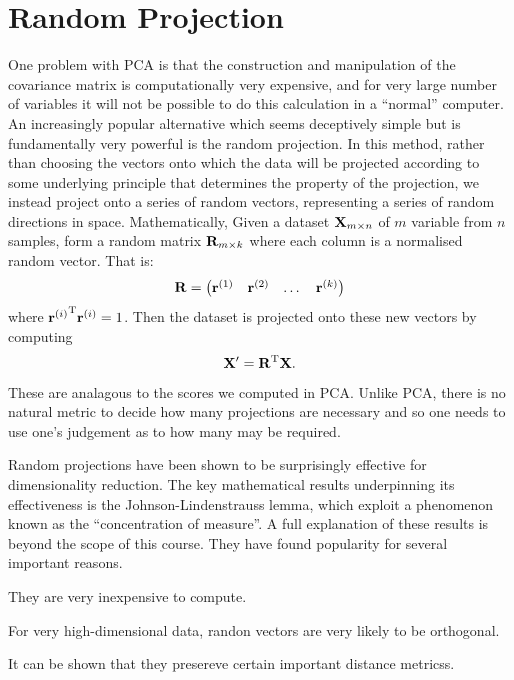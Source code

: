 \documentclass[12pt,a4paper]{tufte-handout}
\begin{document}
\section{Random Projection}
One problem with PCA is that the construction and manipulation of the covariance matrix is computationally very expensive, and for very large number of variables it will not be possible to do this calculation in a ``normal'' computer. An increasingly popular alternative which seems deceptively simple but is fundamentally very powerful is the random projection. In this method, rather than choosing the vectors onto which the data will be projected according to some underlying principle that determines the property of the projection, we instead project onto a series of random vectors, representing a series of random directions in space. Mathematically, Given a dataset $\mathbf{X}_{m\times n}$ of $m$ variable from $n$ samples, form a random matrix $\mathbf{R}_{m\times k}$ where each column is a normalised random vector. That is:
\begin{equation}
\mathbf{R}=\begin{pmatrix}\mathbf{r}^{(1)} & \mathbf{r}^{(2)} & \dots & \mathbf{r}^{(k)}\end{pmatrix}
\end{equation}
where ${\mathbf{r}^{(i)}}^{\mathrm{T}}\mathbf{r}^{(i)} = 1$. Then the dataset is projected onto these new vectors by computing
\begin{equation}
  \mathbf{X}' = \mathbf{R}^{\mathrm{T}}\mathbf{X}.
\end{equation}
These are analagous to the scores we computed in PCA. Unlike PCA, there is no natural metric to decide how many projections are necessary and so one needs to use one's judgement as to how many may be required. 

Random projections have been shown to be surprisingly effective for dimensionality reduction. The key mathematical results underpinning its effectiveness is the Johnson-Lindenstrauss lemma, which exploit a phenomenon known as the ``concentration of measure''. A full explanation of these results is beyond the scope of this course. They have found popularity for several important reasons.
\begin{asparaitem}
  \item They are very inexpensive to compute.
  \item For very high-dimensional data, randon vectors are very likely to be orthogonal.
  \item It can be shown that they presereve certain important distance metricss.
\end{asparaitem}
\end{document}
